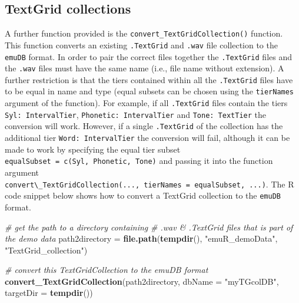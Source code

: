 \documentclass[]{book}
\newenvironment{Shaded}{\begin{snugshade}}{\end{snugshade}}
\newcommand{\CommentTok}[1]{\textcolor[rgb]{0.56,0.35,0.01}{\textit{#1}}}
\newcommand{\DataTypeTok}[1]{\textcolor[rgb]{0.13,0.29,0.53}{#1}}
\newcommand{\KeywordTok}[1]{\textcolor[rgb]{0.13,0.29,0.53}{\textbf{#1}}}
\newcommand{\NormalTok}[1]{#1}
\newcommand{\StringTok}[1]{\textcolor[rgb]{0.31,0.60,0.02}{#1}}
\theoremstyle{definition}
\theoremstyle{definition}
\theoremstyle{definition}
\theoremstyle{remark}
\begin{document}
\hypertarget{textgrid-collections}{%
\subsection{TextGrid collections}\label{textgrid-collections}}

A further function provided is the
\texttt{convert\_TextGridCollection()} function. This function converts
an existing \texttt{.TextGrid} and \texttt{.wav} file collection to the
\texttt{emuDB} format. In order to pair the correct files together the
\texttt{.TextGrid} files and the \texttt{.wav} files must have the same
name (i.e., file name without extension). A further restriction is that
the tiers contained within all the \texttt{.TextGrid} files have to be
equal in name and type (equal subsets can be chosen using the
\texttt{tierNames} argument of the function). For example, if all
\texttt{.TextGrid} files contain the tiers \texttt{Syl:\ IntervalTier},
\texttt{Phonetic:\ IntervalTier} and \texttt{Tone:\ TextTier} the
conversion will work. However, if a single \texttt{.TextGrid} of the
collection has the additional tier \texttt{Word:\ IntervalTier} the
conversion will fail, although it can be made to work by specifying the
equal tier subset
\texttt{equalSubset\ =\ c(\textquotesingle{}Syl\textquotesingle{},\ \textquotesingle{}Phonetic\textquotesingle{},\ \textquotesingle{}Tone\textquotesingle{})}
and passing it into the function argument
\texttt{convert\textbackslash{}\_TextGridCollection(...,\ tierNames\ =\ equalSubset,\ ...)}.
The R code snippet below shows how to convert a TextGrid collection to
the \texttt{emuDB} format.

\begin{Shaded}
\begin{Highlighting}[]
\CommentTok{# get the path to a directory containing}
\CommentTok{# .wav & .TextGrid files that is part of the demo data}
\NormalTok{path2directory =}\StringTok{ }\KeywordTok{file.path}\NormalTok{(}\KeywordTok{tempdir}\NormalTok{(),}
                           \StringTok{"emuR_demoData"}\NormalTok{,}
                           \StringTok{"TextGrid_collection"}\NormalTok{)}

\CommentTok{# convert this TextGridCollection to the emuDB format}
\KeywordTok{convert_TextGridCollection}\NormalTok{(path2directory, }\DataTypeTok{dbName =} \StringTok{"myTGcolDB"}\NormalTok{,}
                           \DataTypeTok{targetDir =} \KeywordTok{tempdir}\NormalTok{())}
\end{Highlighting}
\end{Shaded}
\end{document}
